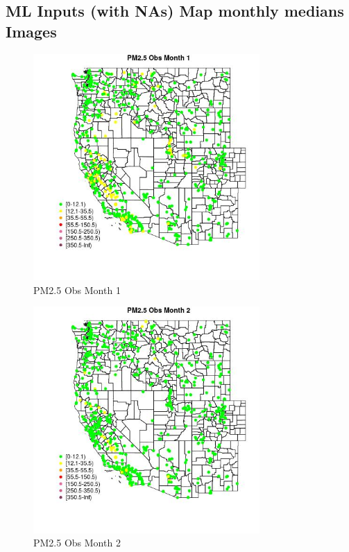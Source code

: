 
\subsection{ML Inputs (with NAs) Map monthly medians Images} 
 

\begin{figure} 
\centering  
\includegraphics[width=0.77\textwidth]{Code_Outputs/Report_ML_input_PM25_Step4_part_e_de_duplicated_aveswNAs_MapObsMo1PM25_Obs.jpg} 
\caption{\label{fig:Report_ML_input_PM25_Step4_part_e_de_duplicated_aveswNAsMapObsMo1PM25_Obs}PM2.5 Obs Month 1} 
\end{figure} 
 

\begin{figure} 
\centering  
\includegraphics[width=0.77\textwidth]{Code_Outputs/Report_ML_input_PM25_Step4_part_e_de_duplicated_aveswNAs_MapObsMo2PM25_Obs.jpg} 
\caption{\label{fig:Report_ML_input_PM25_Step4_part_e_de_duplicated_aveswNAsMapObsMo2PM25_Obs}PM2.5 Obs Month 2} 
\end{figure} 
 


